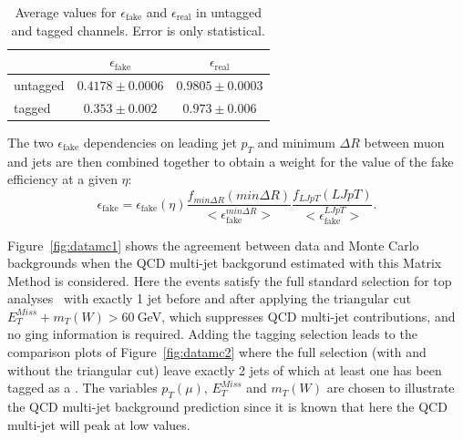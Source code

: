 \begin{table}\centering
\begin{tabular}{l c c }
\toprule
 & $\epsilon_\mathrm{fake}$ &  $\epsilon_\mathrm{real}$  \\\midrule
untagged & $0.4178 \pm 0.0006 $ & $ 0.9805 \pm 0.0003 $ \\
tagged   & $0.353  \pm 0.002 $ & $ 0.973 \pm 0.006 $ \\\bottomrule
\end{tabular}\caption{Average values for $\epsilon_\mathrm{fake}$ and  $\epsilon_\mathrm{real}$ in untagged and tagged channels. Error is only statistical.}\label{tab:averageeffs}
\end{table} 

The two $\epsilon_\mathrm{fake}$ dependencies on  
leading jet $p_T$ and minimum $\Delta R$ between muon and 
jets  are then combined together to obtain a weight for the value of 
the fake efficiency at a given $\eta$:
\begin{equation}
\epsilon_\mathrm{fake} = \epsilon_\mathrm{fake}(\eta) \dfrac{f_{min\Delta R}(min\Delta R)}{<\epsilon_\mathrm{fake}^{min\Delta R}>}\dfrac{f_{LJpT}(LJpT)}{<\epsilon_\mathrm{fake}^{LJpT}>}.
\end{equation}

Figure~\ref{fig:datamc1} shows the agreement between data and Monte Carlo 
backgrounds 
when the QCD multi-jet backgorund estimated with this Matrix Method 
is considered. Here the events satisfy the full standard 
selection for top analyses~\cite{topCommonObjects2012} with 
exactly 1 jet before and after applying the triangular cut 
$E_T^{Miss} + m_T(W)>60~$GeV, which suppresses QCD multi-jet
contributions, and no \btag ging information is 
required. Adding the tagging selection leads to the comparison 
plots of Figure~\ref{fig:datamc2} where the full selection (with 
and without the triangular cut) leave exactly 2 jets of which at 
least one has been tagged as a \bjet. The variables $p_T(\mu)$, 
$E_T^{Miss}$ and $m_T(W)$ are chosen to illustrate the QCD multi-jet 
background prediction since it is known that here the QCD multi-jet will peak at 
low values. 



